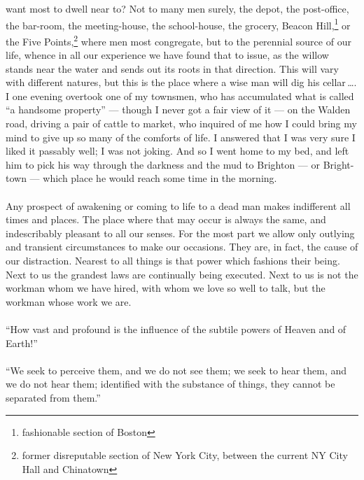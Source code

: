 \documentclass[letterpaper,12pt]{article}
\newcommand{\el}{{\,\ldots}\xspace}
\begin{document}
want most to dwell near to? Not to many men surely, the depot, the post-office,
the bar-room, the meeting-house, the school-house, the grocery, Beacon
Hill,\footnote{fashionable section of Boston} or the Five
Points,\footnote{former disreputable section of New York City, between the
    current NY City Hall and Chinatown} where men most congregate, but to the
perennial source of our life, whence in all our experience we have found that to
issue, as the willow stands near the water and sends out its roots in that
direction. This will vary with different natures, but this is the place where a
wise man will dig his cellar\el{}. I one evening overtook one of my townsmen,
who has accumulated what is called \enquote{a handsome property} --- though I
never got a fair view of it --- on the Walden road, driving a pair of cattle to
market, who inquired of me how I could bring my mind to give up so many of the
comforts of life. I answered that I was very sure I liked it passably well; I
was not joking. And so I went home to my bed, and left him to pick his way
through the darkness and the mud to Brighton --- or Bright-town --- which place
he would reach some time in the morning.

\paragraph{}
Any prospect of awakening or coming to life to a dead man makes indifferent all
times and places. The place where that may occur is always the same, and
indescribably pleasant to all our senses. For the most part we allow only
outlying and transient circumstances to make our occasions. They are, in fact,
the cause of our distraction. Nearest to all things is that power which fashions
their being. Next to us the grandest laws are continually being executed. Next
to us is not the workman whom we have hired, with whom we love so well to talk,
but the workman whose work we are.

\paragraph{}
\enquote{How vast and profound is the influence of the subtile powers of Heaven
    and of Earth!}

\paragraph{}
\enquote{We seek to perceive them, and we do not see them; we seek to hear them,
    and we do not hear them; identified with the substance of things, they
    cannot be separated from them.}
\end{document}
